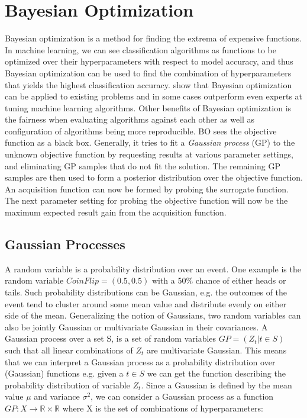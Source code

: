 \section{Bayesian Optimization}\label{sec:bayesian-optimization}
Bayesian optimization is a method for finding the extrema of expensive functions. In machine learning, we can see classification algorithms as functions to be optimized over their hyperparameters with respect to model accuracy, and thus Bayesian optimization can be used to find the combination of hyperparameters that yields the highest classification accuracy. \citet{snoek2012practical} show that Bayesian optimization can be applied to existing problems and in some cases outperform even experts at tuning machine learning algorithms. Other benefits of Bayesian optimization is the fairness when evaluating algorithms against each other as well as configuration of algorithms being more reproducible.
BO sees the objective function as a black box. Generally, it tries to fit a \emph{Gaussian process} (GP) to the unknown objective function by requesting results at various parameter settings, and eliminating GP samples that do not fit the solution. The remaining GP samples are then used to form a posterior distribution over the objective function. An acquisition function can now be formed by probing the surrogate function. The next parameter setting for probing the objective function will now be the maximum expected result gain from the acquisition function.
\begin{algorithm}
\end{algorithm}
\subsection{Gaussian Processes}
A random variable is a probability distribution over an event. One example is the random variable $CoinFlip = (0.5, 0.5)$ with a 50\% chance of either heads or tails. Such probability distributions can be Gaussian, e.g. the outcomes of the event tend to cluster around some mean value and distribute evenly on either side of the mean. Generalizing the notion of Gaussians, two random variables can also be jointly Gaussian or multivariate Gaussian in their covariances. A Gaussian process over a set S, is a set of random variables $GP = (Z_t | t \in S)$ such that all linear combinations of $Z_t$ are multivariate Gaussian. This means that we can interpret a Gaussian process as a probability distribution over (Gaussian) functions e.g. given a $t \in S$ we can get the function describing the probability distribution of variable $Z_t$. Since a Gaussian is defined by the mean value $\mu$ and variance $\sigma^2$, we can consider a Gaussian process as a function $GP : X \rightarrow \mathbb{R} \times \mathbb{R}$ where X is the set of combinations of hyperparameters:

